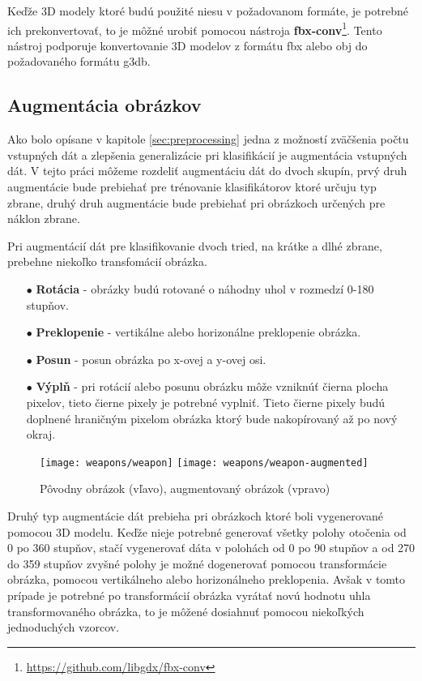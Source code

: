 Keďže 3D modely ktoré budú použité niesu v požadovanom formáte, je potrebné ich prekonvertovať, to je môžné urobiť
    pomocou nástroja \textbf{fbx-conv}\footnote{\url{https://github.com/libgdx/fbx-conv}}.
Tento nástroj podporuje konvertovanie 3D modelov z formátu fbx alebo obj do požadovaného formátu g3db.

\subsection{Augmentácia obrázkov}
\label{subsec:augmentacia}
Ako bolo opísane v kapitole \ref{sec:preprocessing} jedna z možností zväčšenia počtu vstupných dát a zlepšenia generalizácie pri klasifikácií je augmentácia vstupných dát.
V tejto práci môžeme rozdeliť augmentáciu dát do dvoch skupín, prvý druh augmentácie bude prebiehať pre trénovanie klasifikátorov ktoré
    určuju typ zbrane, druhý druh augmentácie bude prebiehať pri obrázkoch určených pre náklon zbrane.

Pri augmentácií dát pre klasifikovanie dvoch tried, na krátke a dlhé zbrane, prebehne niekoľko transfomácií obrázka.
\begin{enumerate}
    \item[$\bullet$] \textbf{Rotácia} - obrázky budú rotované o náhodny uhol v rozmedzí 0-180 stupňov.
    \item[$\bullet$] \textbf{Preklopenie} - vertikálne alebo horizonálne preklopenie obrázka.
    \item[$\bullet$] \textbf{Posun} - posun obrázka po x-ovej a y-ovej osi.
    \item[$\bullet$] \textbf{Výplň} - pri rotácií alebo posunu obrázku môže vzniknúť čierna plocha pixelov, tieto čierne pixely je potrebné vyplniť.
    Tieto čierne pixely budú doplnené hraničným pixelom obrázka ktorý bude nakopírovaný až po nový okraj.
\end{enumerate}

\begin{figure}[H]
    \centering
    \texttt{[image: weapons/weapon]}
    \qquad
    \texttt{[image: weapons/weapon-augmented]}
    \caption{Pôvodny obrázok (vľavo), augmentovaný obrázok (vpravo)}
    \label{pic:imageAugmented}
\end{figure}

Druhý typ augmentácie dát prebieha pri obrázkoch ktoré boli vygenerované pomocou 3D modelu.
Keďže nieje potrebné generovať všetky polohy otočenia od 0 po 360 stupňov, stačí vygenerovať dáta v polohách od 0 po 90 stupňov a od 270 do 359 stupňov
    zvyšné polohy je možné dogenerovať pomocou transformácie obrázka, pomocou vertikálneho alebo horizonálneho preklopenia.
Avšak v tomto prípade je potrebné po transformácií obrázka vyrátať novú hodnotu uhla transformovaného obrázka, to je môžené dosiahnuť pomocou niekoľkých
    jednoduchých vzorcov.

